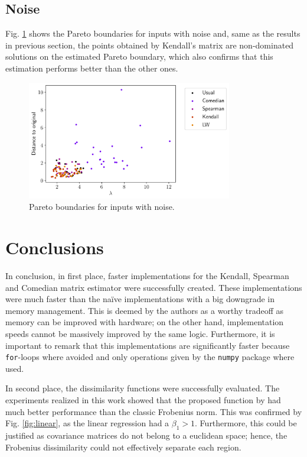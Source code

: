 \documentclass[11pt]{article}
\theoremstyle{definition}
\theoremstyle{remark}
\theoremstyle{remark}
\theoremstyle{remark}
\begin{document}
\subsection{Noise}
Fig. \ref{fig:paretonoise} shows the Pareto boundaries for inputs with noise
and, same as the results in previous section, the points obtained by Kendall's
matrix are non-dominated solutions on the estimated Pareto boundary, which also
confirms that this estimation performs better than the other ones.

\begin{figure}[H]
  \centering \includegraphics[width=0.8\textwidth]{figs/noise-scatter.pdf}
  \caption{Pareto boundaries for inputs with noise.}
  \label{fig:paretonoise}
\end{figure}

\section{Conclusions}\label{sec:conc}

In conclusion, in first place, faster implementations for the Kendall, Spearman
and Comedian matrix estimator were successfully created. These implementations
were much faster than the naïve implementations with a big downgrade in memory
management. This is deemed by the authors as a worthy tradeoff as memory can be
improved with hardware; on the other hand, implementation speeds cannot be
massively improved by the same logic. Furthermore, it is important to remark
that this implementations are significantly faster because \texttt{for}-loops
where avoided and only operations given by the \texttt{numpy} package where
used.

In second place, the dissimilarity functions were successfully evaluated. The
experiments realized in this work showed that the proposed function by
\textcite{tuzel2006} had much better performance than the classic Frobenius
norm. This was confirmed by Fig. \ref{fig:linear}, as the linear regression had
a $\beta_1 > 1$. Furthermore, this could be justified as covariance matrices do
not belong to a euclidean space; hence, the Frobenius dissimilarity could not
effectively separate each region.
\end{document}
